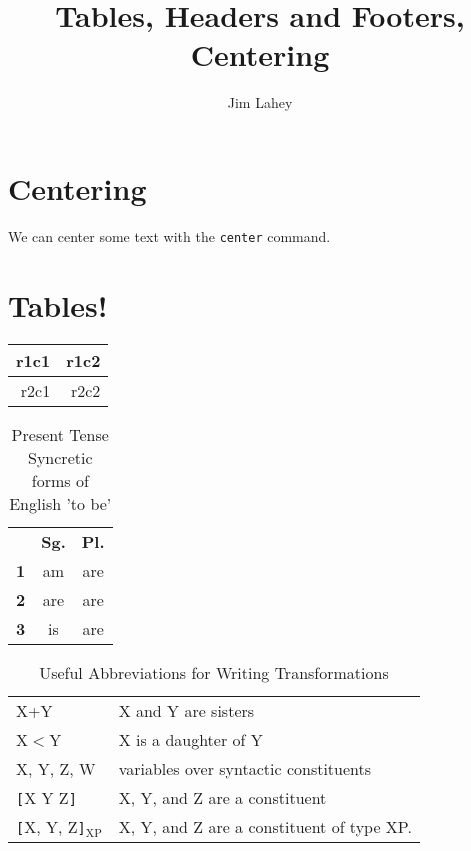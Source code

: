 \documentclass[12pt, twoside]{article}
\title{Tables, Headers and Footers, Centering}
\author{Jim Lahey}
\begin{document}
	
	\maketitle
	
	
	\section{Centering}
	
	\begin{center}
		We can center some text with the \texttt{center} command.
	\end{center}
	
	
	\section{Tables!}

	\begin{center}
		\begin{tabular}{r|r}
			\hline
			r1c1 & r1c2\\
			\hline
			r2c1 & r2c2\\
			\hline
		\end{tabular}
	\end{center}

	\begin{table}[ht]
	  \centering
	  \begin{tabular}[ht]{ccc}
	    &\textbf{Sg.}&\textbf{Pl.}\\
	    \textbf{1}&am&are\\
	    \textbf{2}&are&are\\
	    \textbf{3}&is&are\\
	  \end{tabular}
	  \caption{Present Tense Syncretic forms of English 'to be'}
	  \label{tab:be}
	\end{table}

	\begin{table}[ht]
	  \centering
	  \begin{tabular}[ht]{ll}
	    X+Y&X and Y are sisters\\
	    X$<$Y&X is a daughter of Y\\
	    X, Y, Z, W&variables over syntactic constituents\\
	    \verb~[~X Y Z\verb~]~&X, Y, and Z are a constituent\\
	    \verb![!X, Y, Z\verb!]!$_{\mathrm{XP}}$&X, Y, and Z are a constituent of type XP.
	  \end{tabular}
	  \caption{Useful Abbreviations for Writing Transformations}
	  \label{tab:transformations}
	\end{table}
\end{document}
